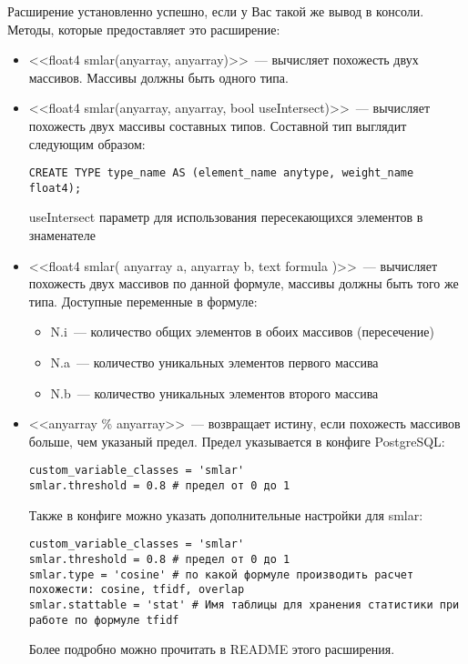 Расширение установленно успешно, если у Вас такой же вывод в консоли. Методы, которые предоставляет это расширение:

\begin{itemize}
\item <<float4 smlar(anyarray, anyarray)>>~--- вычисляет похожесть двух массивов. Массивы должны быть одного типа.
\item <<float4 smlar(anyarray, anyarray, bool useIntersect)>>~--- вычисляет похожесть двух массивы составных типов. Составной тип выглядит следующим образом:
\begin{lstlisting}[label=lst:smlar5,caption=Составной тип]
CREATE TYPE type_name AS (element_name anytype, weight_name float4);
\end{lstlisting}
useIntersect параметр для использования пересекающихся элементов в знаменателе
\item <<float4 smlar( anyarray a, anyarray b, text formula )>>~--- вычисляет похожесть двух массивов по данной формуле, массивы должны быть того же типа. Доступные переменные в формуле:
  \begin{itemize}
    \item N.i~--- количество общих элементов в обоих массивов (пересечение)
    \item N.a~--- количество уникальных элементов первого массива
    \item N.b~--- количество уникальных элементов второго массива
  \end{itemize}
\item <<anyarray \% anyarray>>~--- возвращает истину, если похожесть массивов больше, чем указаный предел. Предел указывается в конфиге PostgreSQL:
\begin{lstlisting}[label=lst:smlar6,caption=Smlar предел]
custom_variable_classes = 'smlar'
smlar.threshold = 0.8 # предел от 0 до 1
\end{lstlisting}

Также в конфиге можно указать дополнительные настройки для smlar:
\begin{lstlisting}[label=lst:smlar7,caption=Smlar настройки]
custom_variable_classes = 'smlar'
smlar.threshold = 0.8 # предел от 0 до 1
smlar.type = 'cosine' # по какой формуле производить расчет похожести: cosine, tfidf, overlap
smlar.stattable = 'stat' # Имя таблицы для хранения статистики при работе по формуле tfidf
\end{lstlisting}

Более подробно можно прочитать в README этого расширения.
\end{itemize}

